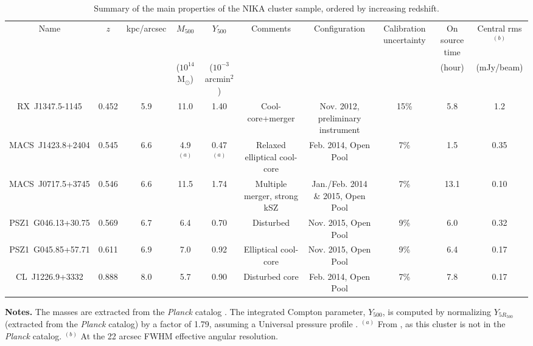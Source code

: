 \documentclass[traditabstract]{aa}
\begin{document}
\begin{table}[]
\caption{\footnotesize{Summary of the main properties of the NIKA cluster sample, ordered by increasing redshift.}}
\begin{center}
\resizebox{\textwidth}{!} {
\begin{tabular}{c|c|c|c|c|c||c|c|c|c}
\hline
\hline
Name & $z$ & kpc/arcsec & $M_{500}$ & $Y_{500}$ & Comments & Configuration & Calibration uncertainty & On source time & Central rms$^{(b)}$ \\
 &  & & ($10^{14}$ M$_{\odot}$)& ($10^{-3}$arcmin$^2$) & & & & (hour) & (mJy/beam) \\
\hline
RX~J1347.5-1145 & 0.452 & 5.9 & 11.0 & 1.40 & Cool-core+merger & Nov. 2012, preliminary instrument & 15\% & 5.8 & 1.2 \\ 
MACS~J1423.8+2404 & 0.545 & 6.6 & 4.9 $^{(a)}$ & 0.47 $^{(a)}$ & Relaxed elliptical cool-core & Feb. 2014, Open Pool & 7\% &1.5 & 0.35 \\ 
MACS~J0717.5+3745 & 0.546 & 6.6 & 11.5 & 1.74 & Multiple merger, strong kSZ & Jan./Feb. 2014 \& 2015, Open Pool & 7\% & 13.1 & 0.10 \\ 
PSZ1~G046.13+30.75 & 0.569 & 6.7 & 6.4 & 0.70 & Disturbed & Nov. 2015, Open Pool & 9\% & 6.0 &  0.32\\ 
PSZ1~G045.85+57.71 & 0.611 & 6.9 & 7.0 & 0.92 & Elliptical cool-core & Nov. 2015, Open Pool & 9\% & 6.4 & 0.17 \\ 
CL~J1226.9+3332 &  0.888 & 8.0 & 5.7 & 0.90 & Disturbed core & Feb. 2014, Open Pool & 7\% & 7.8 & 0.17 \\ 
\hline
\end{tabular}
}
\end{center}
{\small {\bf Notes.} The masses are extracted from the \textit{Planck} catalog \citep{PlanckXXVII2015}. The integrated Compton parameter, $Y_{500}$, is computed by normalizing $Y_{5R_{500}}$ (extracted from the \textit{Planck} catalog) by a factor of 1.79, assuming a Universal pressure profile \citep{Arnaud2010}. $^{(a)}$ From \cite{Adam2016a}, as this cluster is not in the \textit{Planck} catalog. $^{(b)}$ At the 22 arcsec FWHM effective angular resolution.}
\label{tab:cluster_summary}
\end{table}
\end{document}
